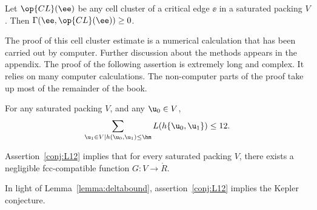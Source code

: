 \begin{theorem} 
\label{lemma:cluster}
Let $\op{CL}(\ee)$ be any cell cluster of a critical edge $\ee$ in a saturated packing $V$.  
Then $\Gamma(\ee,\op{CL}(\ee))\ge 0$.
\end{theorem}

The proof of this cell cluster estimate is a numerical calculation
that has been carried out by computer.  Further discussion about the
methods appears in the appendix. The proof of the following assertion
is extremely long and complex.  It relies on many computer
calculations.  The non-computer parts of the proof take up most of the
remainder of the book.%
%
%

\begin{assertion}\label{conj:L12} 
  For any  saturated packing $ V$, and any $ \u_0\in V$,
\begin{equation}\label{eqn:L12} 
\sum_{ \u_1\in V\mid h( \u_0, \u_1)\le \hm} L(h\{\u_0, \u_1\}) \le 12.
\end{equation}
\end{assertion}

\begin{lemma}[]\label{theorem:mk2} 
Assertion~\ref{conj:L12} implies
that for every saturated packing $V$, there exists a negligible fcc-compatible function
$G:V\to \ring{R}$.
\end{lemma}

\begin{remark}\label{rem:L12KC}
In light of Lemma~\ref{lemma:deltabound}, assertion~\ref{conj:L12}
implies the Kepler conjecture. 
\end{remark}

